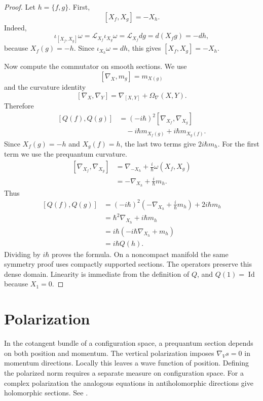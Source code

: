 \begin{proof}
Let $h=\{f,g\}$.  First,
$$
{}[X_f,X_g]=-X_h.
$$
Indeed,
$$
\iota_{[X_f,X_g]}\omega
=\mathcal L_{X_f}\iota_{X_g}\omega
=\mathcal L_{X_f}dg
=d(X_fg)=-dh,
$$
because $X_f(g)=-h$.  Since
$\iota_{X_h}\omega=dh$, this gives
$[X_f,X_g]=-X_h$.

Now compute the commutator on smooth
sections.  We use
$$
{}[\nabla_X,m_g]=m_{X(g)}
$$
and the curvature identity
$$
{}[\nabla_X,\nabla_Y]
=\nabla_{[X,Y]}+\Omega_\nabla(X,Y).
$$
Therefore
$$
\begin{aligned}
{}[Q(f),Q(g)]
&=(-i\hbar)^2[\nabla_{X_f},\nabla_{X_g}]\\
&\quad -i\hbar m_{X_f(g)}
+i\hbar m_{X_g(f)}.
\end{aligned}
$$
Since $X_f(g)=-h$ and $X_g(f)=h$, the last
two terms give $2i\hbar m_h$.  For the
first term we use the prequantum curvature.
$$
\begin{aligned}
{}[\nabla_{X_f},\nabla_{X_g}]
&=\nabla_{-X_h}
+\frac{i}{\hbar}\omega(X_f,X_g)\\
&=-\nabla_{X_h}+\frac{i}{\hbar}m_h.
\end{aligned}
$$
Thus
$$
\begin{aligned}
{}[Q(f),Q(g)]
&=(-i\hbar)^2
\left(-\nabla_{X_h}
+\frac{i}{\hbar}m_h\right)
+2i\hbar m_h\\
&=\hbar^2\nabla_{X_h}+i\hbar m_h\\
&=i\hbar(-i\hbar\nabla_{X_h}+m_h)\\
&=i\hbar Q(h).
\end{aligned}
$$
Dividing by $i\hbar$ proves the formula.
On a noncompact manifold the same symmetry
proof uses compactly supported sections.
The operators preserve this dense domain.
Linearity is immediate from the definition of
$Q$, and $Q(1)=\operatorname{Id}$ because
$X_1=0$.
\end{proof}

\section{Polarization}
\label{section-what-remains}

In the cotangent bundle of a configuration
space, a prequantum section depends on both
position and momentum. The vertical
polarization imposes $\nabla_Vs=0$ in
momentum directions. Locally this leaves a
wave function of position. Defining the
polarized norm requires a separate measure
on configuration space. For a complex
polarization the analogous equations in
antiholomorphic directions give holomorphic
sections. See \cite[Sections 22.3--22.4
and 23.4--23.5]{hallq}.

